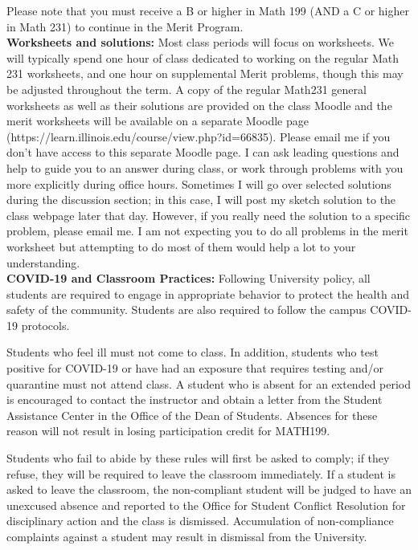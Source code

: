 \documentclass[12pt]{article}
\begin{document}
Please note that you must receive a B or higher in Math 199 (AND a C or higher in Math 231) to continue in the Merit Program.\\


\textbf{Worksheets and solutions:} Most class periods will focus on worksheets. We will typically spend one hour of class dedicated to working on the regular Math 231 worksheets, and one hour on supplemental Merit problems, though this may be adjusted throughout the term. A copy of the regular Math231 general worksheets as well as their solutions are provided on the class Moodle and the merit worksheets will be available on a separate Moodle page (https://learn.illinois.edu/course/view.php?id=66835). Please email me if you don't have access to this separate Moodle page. I can ask leading questions and help to guide you to an answer during class, or work through problems with you more explicitly during office hours. Sometimes I will go over selected solutions during the discussion section; in this case, I will post my sketch solution to the class webpage later that day. However, if you really need the solution to a specific problem, please email me. I am not expecting you to do all problems in the merit worksheet but attempting to do most of them would help a lot to your understanding.\\


\textbf{COVID-19 and Classroom Practices:} Following University policy, all students are required to engage in appropriate behavior to protect the health and safety of the community. Students are also required to follow the campus COVID-19 protocols.

Students who feel ill must not come to class. In addition, students who test positive for COVID-19 or have had an exposure that requires testing and/or quarantine must not attend class. A student who is absent for an extended period is encouraged to contact the instructor and obtain a letter from the Student Assistance Center in the Office of the Dean of Students. Absences for these reason will not result in losing participation credit for MATH199.

Students who fail to abide by these rules will first be asked to comply; if they refuse, they will be required to leave the classroom immediately. If a student is asked to leave the classroom, the non-compliant student will be judged to have an unexcused absence and reported to the Office for Student Conflict Resolution for disciplinary action and the class is dismissed. Accumulation of non-compliance complaints against a student may result in dismissal from the University.\\
\end{document}
